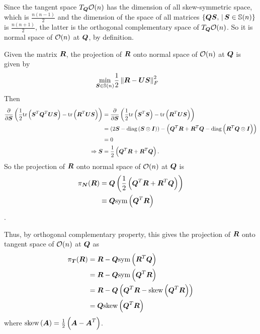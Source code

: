\documentclass[11pt]{article}
\begin{document}
Since the tangent space $T_{\boldsymbol{Q}}{\mathcal O}(n)$ has the dimension of all skew-symmetric space, which is  $\frac{n(n-1)}{2}$ and the dimension of the space of all matrices $\left\{\boldsymbol{QS},\,|\, \boldsymbol{S}\in {\mathbb S}(n)\right\}$ is $\frac{n(n+1)}{2}$,  the latter is the orthogonal complementary space of $T_{\boldsymbol{Q}}{\mathcal O}(n)$. So it is normal space of ${\mathcal O}(n)$ at $\boldsymbol{Q}$, by definition.

Given the matrix $\boldsymbol{R}$, the projection of $\boldsymbol{R}$ onto normal space of ${\mathcal O}(n)$ at $\boldsymbol{Q}$ is given by 
\begin{align*}
\min_{\boldsymbol{S}\in {\mathbb S}(n)} & \frac{1}{2}\left\|\boldsymbol{R} - \boldsymbol{US}\right\|_{F}^{2}
\end{align*}
Then 
\begin{align*}
\frac{\partial }{ \partial \boldsymbol{S}} \left(\frac{1}{2}\text{tr}\left(\boldsymbol{S}^{T}\boldsymbol{Q}^{T}\boldsymbol{US}\right)-\text{tr}\left(\boldsymbol{R}^{T}\boldsymbol{US}\right)\right) &=
 \frac{\partial }{ \partial \boldsymbol{S}} \left(\frac{1}{2}\text{tr}\left(\boldsymbol{S}^{T}\boldsymbol{S}\right)-\text{tr}\left(\boldsymbol{R}^{T}\boldsymbol{US}\right)\right)\\
 &= \left(2\boldsymbol{S} - \text{diag}\left(\boldsymbol{S}\odot \boldsymbol{I}\right)\right) - \left(\boldsymbol{Q}^{T}\boldsymbol{R} + \boldsymbol{R}^{T}\boldsymbol{Q} - \text{diag}\left(\boldsymbol{R}^{T}\boldsymbol{Q}\odot \boldsymbol{I}\right) \right)\\
 &= 0\\
\Rightarrow \boldsymbol{S} &= \frac{1}{2}\left(\boldsymbol{Q}^{T}\boldsymbol{R} + \boldsymbol{R}^{T}\boldsymbol{Q}\right).  
\end{align*}
So the projection of $\boldsymbol{R}$ onto normal space of ${\mathcal O}(n)$ at $\boldsymbol{Q}$ is 
\begin{align}
\pi_{\boldsymbol{N}}(\boldsymbol{R})&=\boldsymbol{Q}\left(\frac{1}{2}\left(\boldsymbol{Q}^{T}\boldsymbol{R} + \boldsymbol{R}^{T}\boldsymbol{Q}\right) \right)\nonumber\\
&\equiv \boldsymbol{Q}\text{sym}\left(\boldsymbol{Q}^{T}\boldsymbol{R} \right) \label{eqn: normap_proj}
\end{align}.

Thus, by orthogonal complementary property, this gives  the projection of $\boldsymbol{R}$ onto tangent space of ${\mathcal O}(n)$ at $\boldsymbol{Q}$ as
\begin{align}
\pi_{\mb{T}}(\mb{R}) &=\mb{R} - \mb{Q}\text{sym}\paren{\mb{R}^{T}\mb{Q} }\\
 &= \mb{R} - \mb{Q}\text{sym}\paren{\mb{Q}^{T}\mb{R} } \nonumber\\
&=  \mb{R} - \mb{Q}\paren{  \mb{Q}^{T}\mb{R}  - \text{skew}\paren{\mb{Q}^{T}\mb{R} }}\nonumber\\
&= \mb{Q}\text{skew}\paren{\mb{Q}^{T}\mb{R} } \label{eqn: tangent_proj} %
\end{align}
where $\text{skew}\left(\boldsymbol{A}\right) = \frac{1}{2}\left(\boldsymbol{A} - \boldsymbol{A}^{T}\right)$.
\end{document}
